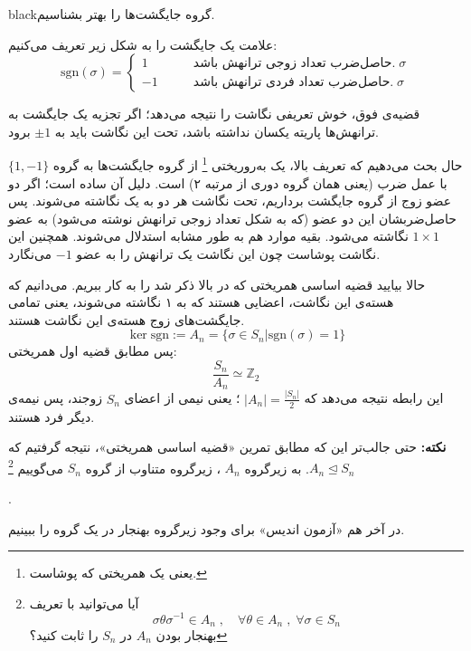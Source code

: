 \documentclass{article}
\begin{document}
\begin{boxes}{black}{گروه جایگشت‌ها را بهتر بشناسیم.}
	
	علامت یک جایگشت را به شکل زیر تعریف می‌کنیم:
	\begin{equation*}
		\text{sgn} (\sigma) = \begin{cases}
			1 & \quad \quad   \text{حاصل‌ضرب تعداد زوجی ترانهش باشد.}\; \sigma \\ 
			-1 & \quad \quad   \text{حاصل‌ضرب تعداد فردی ترانهش باشد.}\; \sigma
		\end{cases} 
	\end{equation*}
	
	قضیه‌ی فوق، خوش تعریفی نگاشت  را نتیجه می‌دهد؛ اگر تجزیه یک جایگشت به ترانهش‌ها پاریته یکسان نداشته باشد، تحت این نگاشت باید به $\pm 1$ برود.
	
	حال بحث می‌دهیم که تعریف بالا، یک به‌روریختی
	\footnote{یعنی یک همریختی که پوشاست.}
	از گروه جایگشت‌ها به گروه
	$\{1,-1\}$
	با عمل ضرب (یعنی همان گروه دوری از مرتبه ۲) است.
	دلیل آن ساده است؛ اگر دو عضو زوج از گروه جایگشت‌ برداریم، تحت نگاشت 
	هر دو به یک نگاشته‌ می‌شوند. پس حاصل‌ضربشان این دو عضو (که به شکل تعداد زوجی ترانهش نوشته می‌شود) به عضو $1\times 1$ نگاشته می‌شود. بقیه موارد هم به طور مشابه استدلال می‌شوند. همچنین این نگاشت پوشاست چون این نگاشت یک ترانهش را به عضو $-1$ می‌نگارد.
	
	\vspace{0.8em}
	حالا بیایید قضیه اساسی همریختی که در بالا ذکر شد را به کار ببریم. می‌دانیم که هسته‌ی این نگاشت، اعضایی هستند که به ۱ نگاشته می‌شوند، یعنی تمامی جایگشت‌های زوج هسته‌ی این نگاشت هستند.
	\[
	\ker \text{sgn} := A_n = \{\sigma \in S_n \big| \text{sgn}(\sigma) = 1\}
	\]
	پس مطابق قضیه اول همریختی:
	\[
	\frac{S_n}{A_n} \simeq \mathbb{Z}_2
	\]
	این رابطه نتیجه می‌دهد که 
	$|A_n| ={ \frac{|S_n|}{2}}$
	؛ یعنی نیمی از اعضای 
	$S_n$ 
	زوجند، پس نیمه‌ی دیگر فرد هستند.
	
	\vspace{0.8em}
	\textbf{نکته:}
	حتی جالب‌تر این که مطابق تمرین «قضیه اساسی همریختی»، نتیجه گرفتیم که 
	$A_n \trianglelefteq S_n$. به زیرگروه 
	$A_n$
	، زیرگروه متناوب 
	از گروه 
	$S_n$
	می‌گوییم
	\footnote{آیا می‌توانید با تعریف
	\[\sigma \theta \sigma^{-1} \in A_n \; , \quad \forall \theta\in A_n\;,\;\forall \sigma\in S_n
	\]
	\quad\quad
	بهنجار بودن 
	$A_n$
	در  $S_n$ را ثابت کنید؟
	}
	
	.
	
	در آخر هم «آزمون اندیس» برای وجود زیرگروه بهنجار در یک گروه را ببینیم.
	

\end{boxes}
\end{document}
